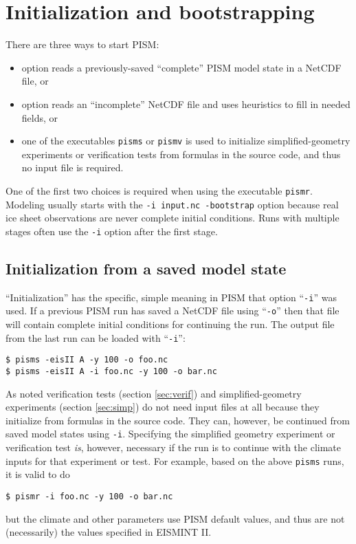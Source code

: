 
\section{Initialization and bootstrapping}
\label{sec:initboot}

There are three ways to start PISM:\begin{itemize}
\item option  reads a previously-saved ``complete'' PISM model state in a NetCDF file, or
\item option   reads an ``incomplete'' NetCDF file and uses heuristics to fill in needed fields, or
\item one of the executables \texttt{pisms} or \texttt{pismv} is used to initialize simplified-geometry experiments or verification tests from formulas in the source code, and thus no input file is required.
\end{itemize}
One of the first two choices is required when using the executable \texttt{pismr}.  Modeling usually starts with the \texttt{-i input.nc -bootstrap} option because real ice sheet observations are never complete initial conditions.  Runs with multiple stages often use the \texttt{-i} option after the first stage.

\subsection{Initialization from a saved model state}  ``Initialization'' has the specific, simple meaning in PISM that option ``\texttt{-i}'' was used.  If a previous PISM run has saved a NetCDF file using ``\texttt{-o}'' then that file will contain complete initial conditions for continuing the run.  The output file from the last run can be loaded with ``\texttt{-i}'': 

\begin{verbatim}
$ pisms -eisII A -y 100 -o foo.nc
$ pisms -eisII A -i foo.nc -y 100 -o bar.nc
\end{verbatim}
\smallskip

As noted verification tests (section \ref{sec:verif}) and simplified-geometry experiments (section \ref{sec:simp}) do not need input files at all because they initialize from formulas in the source code.  They can, however, be continued from saved model states using \texttt{-i}.  Specifying the simplified geometry experiment or verification test \emph{is}, however, necessary if the run is to continue with the climate inputs for that experiment or test.  For example, based on the above \texttt{pisms} runs, it is valid to do
\begin{verbatim}
$ pismr -i foo.nc -y 100 -o bar.nc
\end{verbatim}
but the climate and other parameters use PISM default values, and thus are not (necessarily) the values specified in EISMINT II.

